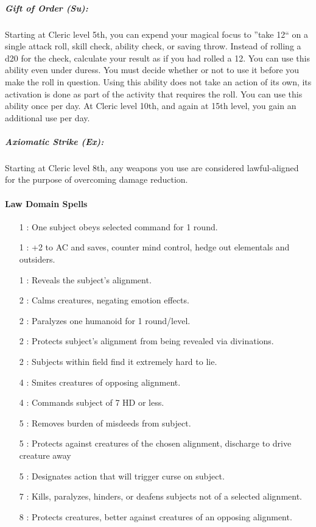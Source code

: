\subparagraph{Gift of Order (Su):}
Starting at Cleric level 5th, you can expend your magical focus to ''take 12`` on a single attack roll, skill check, ability check, or saving throw.
Instead of rolling a d20 for the check, calculate your result as if you had rolled a 12. 
You can use this ability even under duress.
You must decide whether or not to use it before you make the roll in question.
Using this ability does not take an action of its own, its activation is done as part of the activity that requires the roll.
You can use this ability once per day. At Cleric level 10th, and again at 15th level, you gain an additional use per day.
\subparagraph{Axiomatic Strike (Ex):}
Starting at Cleric level 8th, any weapons you use are considered lawful-aligned for the purpose of overcoming damage reduction.
\paragraph{Law Domain Spells}
\begin{itemize}
\item[1] : One subject obeys selected command for 1 round.
\item[1] : +2 to AC and saves, counter mind control, hedge out elementals and outsiders.
\item[1] : Reveals the subject's alignment.
\item[2] : Calms creatures, negating emotion effects.
\item[2] : Paralyzes one humanoid for 1 round/level.
\item[2] : Protects subject's alignment from being revealed via divinations.
\item[2] : Subjects within field find it extremely hard to lie.
\item[4] : Smites creatures of opposing alignment.
\item[4] : Commands subject of 7 HD or less.
\item[5] : Removes burden of misdeeds from subject. 
\item[5] : Protects against creatures of the chosen alignment, discharge to drive creature away
\item[5] : Designates action that will trigger curse on subject.
\item[7] : Kills, paralyzes, hinders, or deafens subjects not of a selected alignment.
\item[8] : Protects creatures, better against creatures of an opposing alignment.
\end{itemize}

